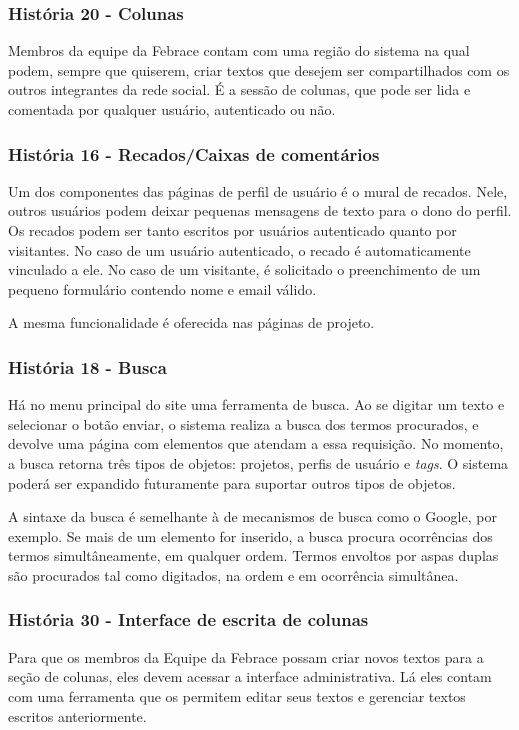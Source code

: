     \subsubsection{História 20 - Colunas}
      Membros da equipe da Febrace contam com uma região do sistema na qual podem, sempre que quiserem, criar textos que desejem ser compartilhados com os outros integrantes da rede social. É a sessão de colunas, que pode ser lida e comentada por qualquer usuário, autenticado ou não.

    \subsubsection{História 16 - Recados/Caixas de comentários}
      Um dos componentes das páginas de perfil de usuário é o mural de recados. Nele, outros usuários podem deixar pequenas mensagens de texto para o dono do perfil. Os recados podem ser tanto escritos por usuários autenticado quanto por visitantes. No caso de um usuário autenticado, o recado é automaticamente vinculado a ele. No caso de um visitante, é solicitado o preenchimento de um pequeno formulário contendo nome e email válido.

      A mesma funcionalidade é oferecida nas páginas de projeto.

    \subsubsection{História 18 - Busca}
      Há no menu principal do site uma ferramenta de busca. Ao se digitar um texto e selecionar o botão enviar, o sistema realiza a busca dos termos procurados, e devolve uma página com elementos que atendam a essa requisição. No momento, a busca retorna três tipos de objetos: projetos, perfis de usuário e \textit{tags}. O sistema poderá ser expandido futuramente para suportar outros tipos de objetos.

      A sintaxe da busca é semelhante à de mecanismos de busca como o Google, por exemplo. Se mais de um elemento for inserido, a busca procura ocorrências dos termos simultâneamente, em qualquer ordem. Termos envoltos por aspas duplas são procurados tal como digitados, na ordem e em ocorrência simultânea.

    \subsubsection{História 30 - Interface de escrita de colunas}
      Para que os membros da Equipe da Febrace possam criar novos textos para a seção de colunas, eles devem acessar a interface administrativa. Lá eles contam com uma ferramenta que os permitem editar seus textos e gerenciar textos escritos anteriormente.

